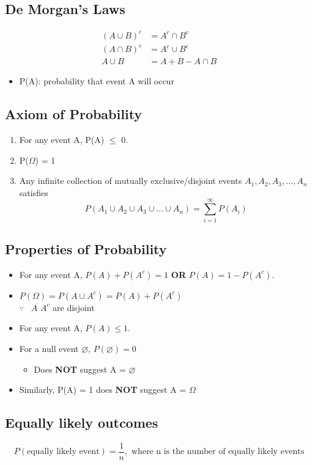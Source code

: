 \documentclass[a4paper]{article}
\begin{document}
\subsection{De Morgan's Laws}
\begin{align*}
    (A\cup B)^{c} &= A^{c} \cap B^{c}\\
    (A\cap B)^{c} &= A^{c} \cup B^{c}\\
    A \cup B &= A+B-A\cap B
\end{align*}
\begin{itemize}
    \item P(A): probability that event A will occur
\end{itemize}
\subsection{Axiom of Probability}
\begin{enumerate}
    \item For any event A, P(A) $\leq$ 0.
    \item P($\Omega$) = 1
    \item Any infinite collection of mutually exclusive/disjoint events $A_{1}, A_{2}, A_{3}, \ldots, A_{n}$ satisfies
    $$P(A_{1}\cup A_{2}\cup A_{3} \cup \ldots \cup A_{n}) = \sum_{i=1}^{\infty}P(A_{i})$$
\end{enumerate}
\subsection{Properties of Probability}
\begin{itemize}
    \item For any event A, $P(A) + P(A^c) = 1$ \textbf{OR} $P(A) = 1 - P(A^c)$.
    \item $P(\Omega) = P(A\cup A^c) = P(A) + P(A^c)$\\
    $\because$ \ $A$  $A^c$ are disjoint
    \item For any event A, $P(A) \leq 1$.
    \item For a null event $\varnothing$, $P(\varnothing) = 0$
    \begin{itemize}[label=$\circ$]
        \item Does \textbf{NOT} suggest A = $\varnothing$
    \end{itemize}
    \item Similarly, P(A) = 1 does \textbf{NOT} suggest A = $\Omega$
\end{itemize}
\subsection{Equally likely outcomes}
$$P(\text{equally likely event}) = \frac{1}{n},\text{ where n is the number of equally likely events}$$
\end{document}
